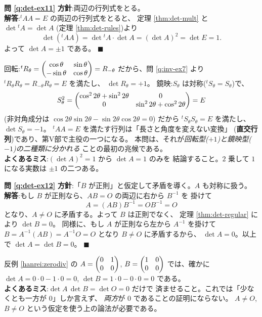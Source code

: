 \bigskip
\noindent\textbf{問 \ref{q:det-ex11}}\quad
\textbf{方針}:両辺の行列式をとる。\\
\textbf{解答}:${}^t\!A A = E$ の両辺の行列式をとると、
定理 \ref{thm:det-mult} と $\det {}^t\!A = \det A$
(定理 \ref{thm:det-rules})より
\[
\det({}^t\!A A) = \det {}^t\!A \cdot \det A = (\det A)^2 = \det E = 1.
\]
よって $\det A = \pm 1$ である。 $\blacksquare$

回転:${}^t R_\theta = \begin{pmatrix}\cos\theta & \sin\theta \\ -\sin\theta & \cos\theta\end{pmatrix}
= R_{-\theta}$ だから、問 \ref{q:inv-ex7} より
${}^t R_\theta R_\theta = R_{-\theta} R_\theta = E$ を満たし、
$\det R_\theta = +1$。
鏡映:$S_\theta$ は対称(${}^t S_\theta = S_\theta$)で、
\[
S_\theta^2 = \begin{pmatrix}\cos^2 2\theta + \sin^2 2\theta & 0 \\
0 & \sin^2 2\theta + \cos^2 2\theta\end{pmatrix} = E
\]
(非対角成分は $\cos 2\theta \sin 2\theta - \sin 2\theta \cos 2\theta = 0$)
だから ${}^t S_\theta S_\theta = E$ を満たし、$\det S_\theta = -1$。
${}^t\!A A = E$ を満たす行列は「長さと角度を変えない変換」
(\textbf{直交行列})であり、第V部で主役の一つになる。
本問は、それが\emph{回転型($+1$)と鏡映型($-1$)の二種類に分かれる}
ことの最初の兆候である。\\
\textbf{よくあるミス}:$(\det A)^2 = 1$ から $\det A = 1$ のみを
結論すること。$2$ 乗して $1$ になる実数は $\pm 1$ の二つある。

\bigskip
\noindent\textbf{問 \ref{q:det-ex12}}\quad
\textbf{方針}:「$B$ が正則」と仮定して矛盾を導く。$A$ も対称に扱う。\\
\textbf{解答}:もし $B$ が正則なら、$AB = O$ の両辺に右から $B^{-1}$ を
掛けて
\[
A = (AB)B^{-1} = O B^{-1} = O
\]
となり、$A \neq O$ に矛盾する。よって $B$ は正則でなく、
定理 \ref{thm:det-regular} により $\det B = 0$。
同様に、もし $A$ が正則なら左から $A^{-1}$ を掛けて
$B = A^{-1}(AB) = A^{-1}O = O$ となり $B \neq O$ に矛盾するから、
$\det A = 0$。以上で $\det A = \det B = 0$。 $\blacksquare$

反例 \ref{hanrei:zerodiv} の $A = \begin{pmatrix}0 & 1 \\ 0 & 0\end{pmatrix}$,
$B = \begin{pmatrix}1 & 0 \\ 0 & 0\end{pmatrix}$ では、確かに
$\det A = 0 \cdot 0 - 1 \cdot 0 = 0$, $\det B = 1 \cdot 0 - 0 \cdot 0 = 0$
である。\\
\textbf{よくあるミス}:$\det A \, \det B = \det O = 0$ だけで
済ませること。これでは「少なくとも一方が $0$」しか言えず、
\emph{両方}が $0$ であることの証明にならない。
$A \neq O$, $B \neq O$ という仮定を使う上の論法が必要である。

